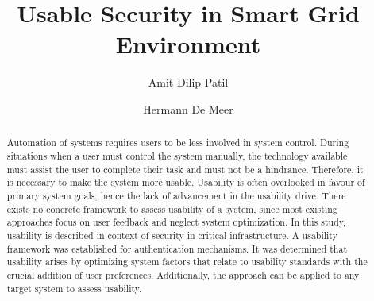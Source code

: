 \documentclass[sigconf]{acmart}
\begin{document}
\title{Usable Security in Smart Grid Environment}


\author{Amit Dilip Patil}

\author{Hermann De Meer}



\renewcommand{\shortauthors}{Patil et al.}


\begin{abstract}
Automation of systems requires users to be less involved in system control. During situations when a user must control the system manually, the technology available must assist the user to complete their task and must not be a hindrance. Therefore, it is necessary to make the system more usable. Usability is often overlooked in favour of primary system goals, hence the lack of advancement in the usability drive. There exists no concrete framework to assess usability of a system, since most existing approaches focus on user feedback and neglect system optimization. In this study, usability is described in context of security in critical infrastructure. A usability framework was established for authentication mechanisms. It was determined that usability arises by optimizing system factors that relate to usability standards with the crucial addition of user preferences. Additionally, the approach can be applied to any target system to assess usability.
\end{abstract}
\end{document}
